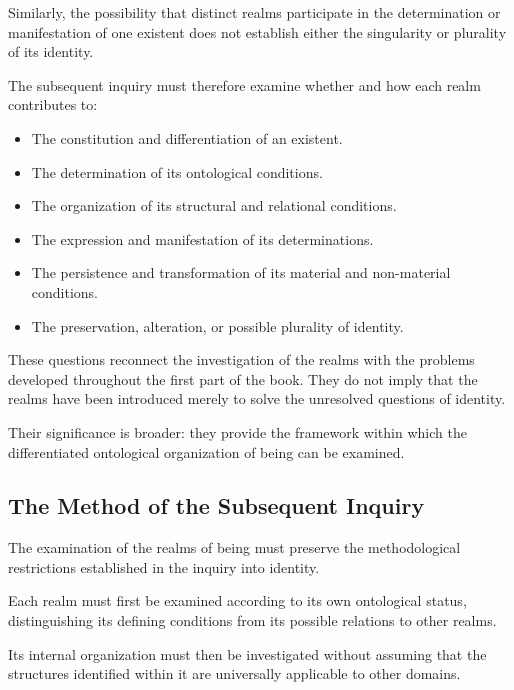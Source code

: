 Similarly, the possibility that distinct realms
participate in the determination or manifestation
of one existent does not establish either the
singularity or plurality of its identity.

The subsequent inquiry must therefore examine
whether and how each realm contributes to:

\begin{itemize}
    \item The constitution and differentiation of
    an existent.
    \item The determination of its ontological
    conditions.
    \item The organization of its structural and
    relational conditions.
    \item The expression and manifestation of its
    determinations.
    \item The persistence and transformation of
    its material and non-material conditions.
    \item The preservation, alteration, or possible
    plurality of identity.
\end{itemize}

These questions reconnect the investigation of
the realms with the problems developed throughout
the first part of the book. They do not imply
that the realms have been introduced merely to
solve the unresolved questions of identity.

Their significance is broader: they provide
the framework within which the differentiated
ontological organization of being can be examined.


\subsection{The Method of the Subsequent Inquiry}

The examination of the realms of being must preserve
the methodological restrictions established in
the inquiry into identity.

Each realm must first be examined according to
its own ontological status, distinguishing its
defining conditions from its possible relations
to other realms.

Its internal organization must then be investigated
without assuming that the structures identified
within it are universally applicable to other
domains.


